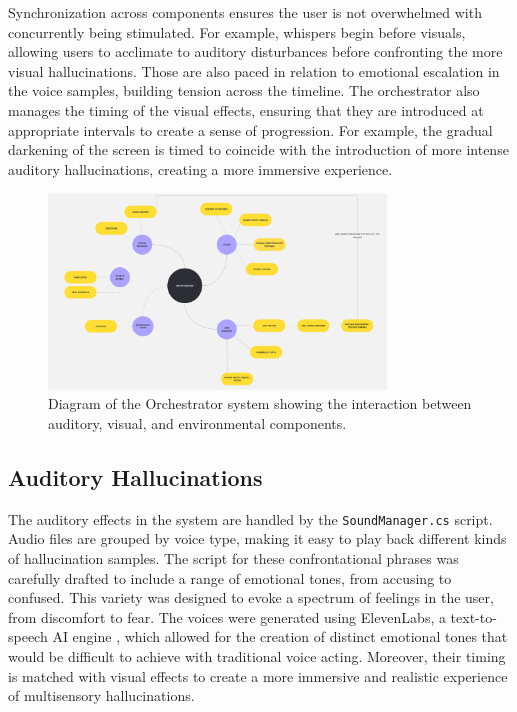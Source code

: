 Synchronization across components ensures the user is not overwhelmed with concurrently being stimulated. For example, whispers begin before visuals, allowing users to acclimate to auditory disturbances before confronting the more visual hallucinations. Those are also paced in relation to emotional escalation in the voice samples, building tension across the timeline.
The orchestrator also manages the timing of the visual effects, ensuring that they are introduced at appropriate intervals to create a sense of progression. For example, the gradual darkening of the screen is timed to coincide with the introduction of more intense auditory hallucinations, creating a more immersive experience.
\begin{figure}[h!]
    \centering
    \includegraphics[width=0.8\textwidth]{../../Figures/Orch-sequence.png}
    \caption{Diagram of the Orchestrator system showing the interaction between auditory, visual, and environmental components.}
    \label{fig:orchestrator}
\end{figure}


\subsection{Auditory Hallucinations}
The auditory effects in the system are handled by the \texttt{SoundManager.cs} script. Audio files are grouped by voice type, making it easy to play back different kinds of hallucination samples. The script for these confrontational phrases was carefully drafted to include a range of emotional tones, from accusing to confused. This variety was designed to evoke a spectrum of feelings in the user, from discomfort to fear. The voices were generated using ElevenLabs, a text-to-speech AI engine \cite{elevenlabs}, which allowed for the creation of distinct emotional tones that would be difficult to achieve with traditional voice acting. Moreover, their timing is matched with visual effects to create a more immersive and realistic experience of multisensory hallucinations.

